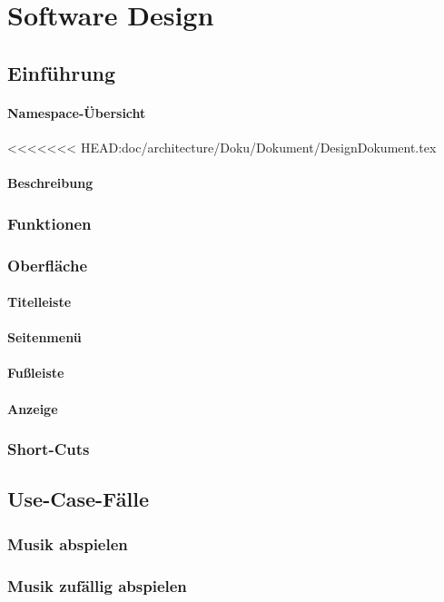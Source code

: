 
\chapter{Software Design}

\section{Einführung}

\subsubsection{Namespace-Übersicht}
<<<<<<< HEAD:doc/architecture/Doku/Dokument/DesignDokument.tex
\subsubsection{Beschreibung}
\subsection{Funktionen}
\subsection{Oberfläche}
\subsubsection{Titelleiste}
\subsubsection{Seitenmenü}
\subsubsection{Fußleiste}
\subsubsection{Anzeige}
\subsection{Short-Cuts}
\section{Use-Case-Fälle}
\subsection{Musik abspielen}
\subsection{Musik zufällig abspielen}
